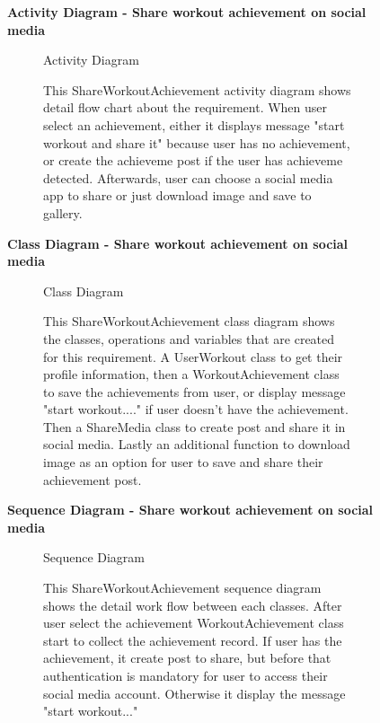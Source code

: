 \documentclass{article}
\begin{document}
	\begin{figure}[htbp]
		\textbf{Activity Diagram - Share workout achievement on social media }
		\centering
		\begin{subfigure}{\textwidth}
			\resizebox{\textwidth}{!}{}
			\caption{Activity Diagram}
		\end{subfigure}
		\begin{subfigure}{\textwidth}
			This ShareWorkoutAchievement activity diagram shows detail flow chart about the requirement. 
			When user select an achievement, either it displays message "start workout and share it" because user has no 
			achievement, or create the achieveme post if the user has achieveme detected. Afterwards, user can choose a 
			social media app to share or just download image and save to gallery.
		\end{subfigure}
	\end{figure}
	
	\clearpage

	\begin{figure}[htbp]
		\textbf{Class Diagram - Share workout achievement on social media }
		\centering
		\begin{subfigure}{\textwidth}
			\resizebox{\textwidth}{!}{}
			\caption{Class Diagram}
		\end{subfigure}
		\begin{subfigure}{\textwidth}
			This ShareWorkoutAchievement class diagram shows the classes, operations and variables that are created
			for this requirement. A UserWorkout class to get their profile information, then a WorkoutAchievement class to save 
			the achievements from user, or display message "start workout...." if user doesn't have the achievement. 
			Then a ShareMedia class to create post and share it in social media. Lastly an additional function to download image
			as an option for user to save and share their achievement post.
		\end{subfigure}
	\end{figure}
	
	\clearpage
	\begin{figure}[htbp]
		\textbf{Sequence Diagram - Share workout achievement on social media }
		\centering
		\begin{subfigure}{\textwidth}
			\resizebox{\textwidth}{!}{}
			\caption{Sequence Diagram}
		\end{subfigure}
		\begin{subfigure}{\textwidth}
			This ShareWorkoutAchievement sequence diagram shows the detail work flow between each classes. After user select the achievement
			WorkoutAchievement class start to collect the achievement record. If user has the achievement, it create post to share, but before that authentication is 
			mandatory for user to access their social media account. Otherwise it display the message "start workout..."
		\end{subfigure}
	\end{figure}
	\clearpage
\end{document}
